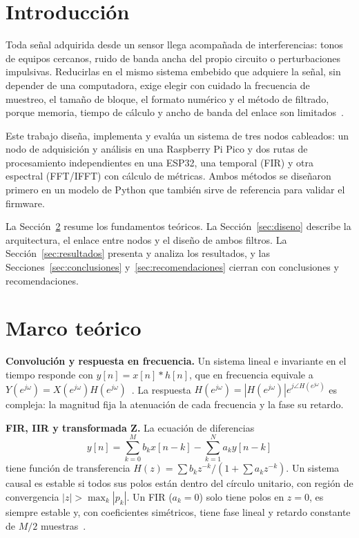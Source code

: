 \documentclass[conference]{IEEEtran}
\begin{document}
\section{Introducción}
Toda señal adquirida desde un sensor llega acompañada de interferencias: tonos de
equipos cercanos, ruido de banda ancha del propio circuito o perturbaciones
impulsivas. Reducirlas en el mismo sistema embebido que adquiere la señal, sin
depender de una computadora, exige elegir con cuidado la frecuencia de muestreo, el
tamaño de bloque, el formato numérico y el método de filtrado, porque memoria, tiempo
de cálculo y ancho de banda del enlace son limitados~\cite{enunciado}.

Este trabajo diseña, implementa y evalúa un sistema de tres nodos cableados: un nodo de
adquisición y análisis en una Raspberry Pi Pico y dos rutas de procesamiento
independientes en una ESP32, una temporal (FIR) y otra espectral (FFT/IFFT) con
cálculo de métricas. Ambos métodos se diseñaron primero en un modelo de Python que
también sirve de referencia para validar el firmware.

La Sección~\ref{sec:teoria} resume los fundamentos teóricos. La
Sección~\ref{sec:diseno} describe la arquitectura, el enlace entre nodos y el diseño de
ambos filtros. La Sección~\ref{sec:resultados} presenta y analiza los resultados, y las
Secciones~\ref{sec:conclusiones} y~\ref{sec:recomendaciones} cierran con conclusiones y
recomendaciones.

\section{Marco teórico}\label{sec:teoria}
\textbf{Convolución y respuesta en frecuencia.} Un sistema lineal e invariante en el
tiempo responde con $y[n]=x[n]*h[n]$, que en frecuencia equivale a
$Y(e^{j\omega})=X(e^{j\omega})H(e^{j\omega})$~\cite{oppenheim2010}. La respuesta
$H(e^{j\omega})=|H(e^{j\omega})|e^{j\angle H(e^{j\omega})}$ es compleja: la magnitud
fija la atenuación de cada frecuencia y la fase su retardo.

\textbf{FIR, IIR y transformada Z.} La ecuación de diferencias
\begin{equation}
y[n]=\sum_{k=0}^{M} b_k x[n-k]-\sum_{k=1}^{N} a_k y[n-k]
\end{equation}
tiene función de transferencia $H(z)=\sum b_k z^{-k}/(1+\sum a_k z^{-k})$. Un sistema
causal es estable si todos sus polos están dentro del círculo unitario, con región de
convergencia $|z|>\max_k|p_k|$. Un FIR ($a_k=0$) solo tiene polos en $z=0$, es siempre
estable y, con coeficientes simétricos, tiene fase lineal y retardo constante de $M/2$
muestras~\cite{proakis2007}.
\end{document}
